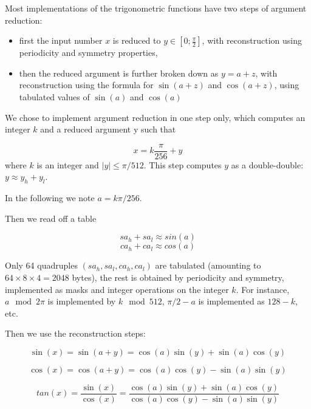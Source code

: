 Most implementations of the trigonometric functions have two steps of argument reduction: 
\begin{itemize}
\item first the input number $x$ is reduced to $y\in
  [0;\frac{\pi}{2}]$, with reconstruction using periodicity and
  symmetry properties,
\item then the reduced argument is further broken down as $y=a+z$,
  with reconstruction using the formula for $\sin(a+z)$ and
  $\cos(a+z)$, using tabulated values of $\sin(a)$ and
  $\cos(a)$
\end{itemize}

We chose to implement argument reduction in one step only, which
computes an integer $k$ and a reduced argument y such that

\begin{equation}
  x = k\frac{\pi}{256} + y\label{eq:trigoargred}
\end{equation}
where $k$ is an integer and  $ |y| \leq {\pi}/{512}$.
This step computes $y$ as a double-double: $y\approx y_h+y_l$. 

In the following we note $a=k\pi/256$. 

Then we read off a table 

$$sa_h+sa_l \approx sin(a)$$
$$ca_h+ca_l \approx cos(a)$$

Only 64 quadruples $(sa_h,sa_l,ca_h,ca_l)$ are tabulated (amounting to
$64\times 8 \times 4 = 2048$ bytes), the rest is obtained by
periodicity and symmetry, implemented as masks and integer operations
on the integer $k$. For instance,  $a \mod 2\pi$ is implemented by $k \mod 512$,
$\pi/2-a$ is implemented as $128-k$, etc.



Then we use the reconstruction steps:

\begin{equation}        
  \sin(x) = \sin(a + y) =  \cos(a) \sin(y) +  \sin(a) \cos(y) 
  \label{eq:sinapy}
\end{equation}

\begin{equation}
  \cos(x) = \cos(a + y) = \cos(a) \cos(y) -  \sin(a) \sin(y) 
  \label{eq:cosapy}
\end{equation}

\begin{equation} 
  tan(x) = \frac{\sin(x)}{\cos(x)} = \frac{\cos(a) \sin(y) +  \sin(a) \cos(y)}{\cos(a) \cos(y) -  \sin(a) \sin(y)}
  \label{eq:tanapy}
\end{equation}



